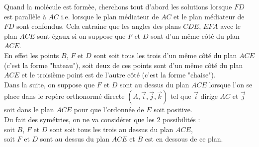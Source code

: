 \documentclass[a4paper,11pt]{book}
\begin{document}
Quand la mol\'ecule est form\`ee, cherchons tout d'abord les solutions lorsque 
$FD$ est parall\`ele \`a $AC$ i.e. lorsque le plan m\'ediateur de $AC$ et le 
plan m\'ediateur de $FD$ sont confondus. 
Cela entraine que les angles des plans $CDE$, $EFA$ avec le plan $ACE$ sont 
\'egaux si on suppose que $F$ et $D$ sont d'un m\^eme c\^ot\'e du plan $ACE$.\\
En effet les points $B$, $F$ et $D$ sont soit tous les trois d'un m\^eme 
c\^ot\'e du plan $ACE$ (c'est la forme "bateau"), soit deux de ces points sont  
d'un m\^eme c\^ot\'e du plan $ACE$ et le troisi\`eme point est de l'autre 
c\^ot\'e (c'est la forme "chaise").\\
Dans la suite, on suppose que $F$ et $D$ sont au dessus du plan $ACE$ lorsque
l'on se place dans le rep\`ere orthonorm\'e directe 
$(A,\overrightarrow{i},\overrightarrow{j},\overrightarrow{k})$ tel que
$\overrightarrow{i}$ dirige $AC$ et $\overrightarrow{j}$ soit dans le plan
$ACE$ pour que l'ordonn\'ee de $E$ soit positive.\\
Du fait des sym\'etries, on ne va consid\'erer que les 2 possibilit\'es :\\
soit $B$, $F$ et $D$ sont soit tous les trois au dessus du plan $ACE$,\\
soit $F$ et $D$ sont au dessus du plan $ACE$ et $B$ est en dessous de ce plan.
\end{document}

